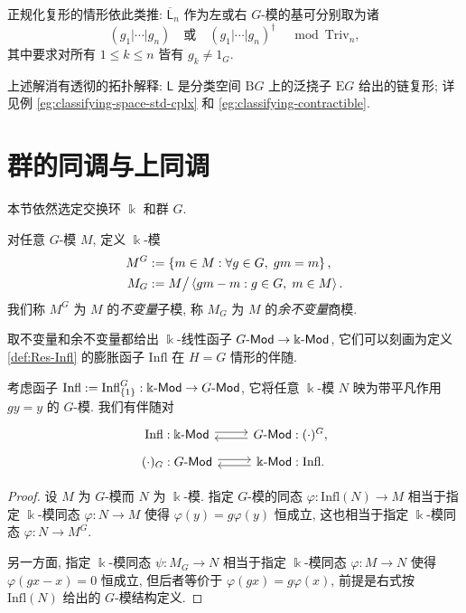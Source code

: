 正规化复形的情形依此类推: $\overline{\mathsf{L}}_n$ 作为左或右 $G$-模的基可分别取为诸
\begin{equation}\label{eqn:nor-cochain}
	(g_1| \cdots | g_n) \quad \text{或} \quad (g_1 | \cdots | g_n)^\dagger \quad \bmod \mathrm{Triv}_n,
\end{equation}
其中要求对所有 $1 \leq k \leq n$ 皆有 $g_k \neq 1_G$.

\begin{remark}
	上述解消有透彻的拓扑解释: $\mathsf{L}$ 是分类空间 $\mathrm{B}G$ 上的泛挠子 $\mathrm{E}G$ 给出的链复形; 详见例 \ref{eg:classifying-space-std-cplx} 和 \ref{eg:classifying-contractible}.
\end{remark}

\section{群的同调与上同调}\label{sec:group-coh-sub}
本节依然选定交换环 $\Bbbk$ 和群 $G$.

\begin{definition}
	对任意 $G$-模 $M$, 定义 $\Bbbk$-模
	\begin{align*}
		M^G & := \left\{ m \in M : \forall g \in G, \; gm = m \right\}, \\
		M_G & := M \big/ \left\langle gm - m : g \in G, \; m \in M \right\rangle.
	\end{align*}
	我们称 $M^G$ 为 $M$ 的\emph{不变量}子模, 称 $M_G$ 为 $M$ 的\emph{余不变量}商模.
\end{definition}

取不变量和余不变量都给出 $\Bbbk$-线性函子 $G\text{-}\mathsf{Mod} \to \Bbbk\text{-}\mathsf{Mod}$, 它们可以刻画为定义 \ref{def:Res-Infl} 的膨胀函子 $\mathrm{Infl}$ 在 $H = G$ 情形的伴随.

\begin{proposition}\label{prop:inv-coinv-infl}
	考虑函子 $\mathrm{Infl} := \mathrm{Infl}^G_{\{1\}}: \Bbbk\text{-}\mathsf{Mod} \to G\text{-}\mathsf{Mod}$, 它将任意 $\Bbbk$-模 $N$ 映为带平凡作用 $gy=y$ 的 $G$-模. 我们有伴随对
	\[\begin{tikzcd}[row sep=tiny]
		\mathrm{Infl}: \Bbbk\dcate{Mod} \arrow[shift left, r] & G\dcate{Mod} : (\cdot)^G , \arrow[shift left, l] \\
		(\cdot)_G: G\dcate{Mod} \arrow[shift left, r] & \Bbbk\dcate{Mod}: \mathrm{Infl}. \arrow[shift left, l]
	\end{tikzcd}\]
\end{proposition}
\begin{proof}
	设 $M$ 为 $G$-模而 $N$ 为 $\Bbbk$-模. 指定 $G$-模的同态 $\varphi: \mathrm{Infl}(N) \to M$ 相当于指定 $\Bbbk$-模同态 $\varphi: N \to M$ 使得 $\varphi(y) = g \varphi(y)$ 恒成立, 这也相当于指定 $\Bbbk$-模同态 $\varphi: N \to M^G$.
	
	另一方面, 指定 $\Bbbk$-模同态 $\psi: M_G \to N$ 相当于指定 $\Bbbk$-模同态 $\varphi: M \to N$ 使得 $\varphi(gx-x) = 0$ 恒成立, 但后者等价于 $\varphi(gx) = g\varphi(x)$, 前提是右式按 $\mathrm{Infl}(N)$ 给出的 $G$-模结构定义.
\end{proof}

